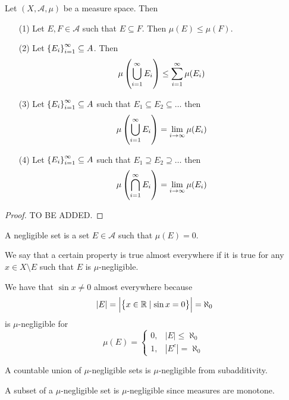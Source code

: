 \documentclass[11pt,a4paper]{article}
\newcommand{\A}{\mathcal A}
\begin{document}
\begin{proposition}
  Let $(X, \A, \mu)$ be a measure space.
  Then
  \begin{enumerate}
    \item[(1)] Let $E,F \in \A$ such that $E \subseteq F$.
      Then $\mu(E) \le \mu(F)$.
    \item[(2)] Let $\set{E_i}_{i=1}^{\infty} \subseteq A$.
      Then
      \[
        \mu\del{\bigcup_{i=1}^{\infty} E_i} \le \sum_{i=1}^{\infty} \mu(E_i)
      \]
    \item[(3)] Let $\set{E_i}_{i=1}^{\infty} \subseteq A$ such that
      $E_1 \subseteq E_2 \subseteq \dots$ then
      \[
        \mu\del{\bigcup_{i=1}^{\infty} E_i} =
        \lim_{i \to \infty} \mu(E_i)
      \]
    \item[(4)] Let $\set{E_i}_{i=1}^{\infty} \subseteq A$ such that
      $E_1 \supseteq E_2 \supseteq \dots$ then
      \[
        \mu\del{\bigcap_{i=1}^{\infty} E_i} =
        \lim_{i \to \infty} \mu(E_i)
      \]
  \end{enumerate}
\end{proposition}
\begin{proof}
  TO BE ADDED.
\end{proof}

\begin{definition}
  A negligible set is a set $E \in \A$ such that $\mu(E) = 0$.
\end{definition}

\begin{definition}
  We say that a certain property is true almost everywhere if it is true
  for any $x \in X \setminus E$ such that $E$ is $\mu$-negligible.
\end{definition}

\begin{example}
  We have that $\sin x \neq 0$ almost everywhere because
  \[
    |E| = \left|\set{x \in \mathbb{R}\mid \sin x = 0}\right| = \aleph_0
  \]
  is $\mu$-negligible for 
  \[
    \mu(E) =
    \begin{cases}
      0, &|E| \le \aleph_0 \\
      1, &|E^c| = \aleph_0
    \end{cases}
  \]
\end{example}
\begin{remark}
  A countable union of $\mu$-negligible sets is $\mu$-negligible from
  subadditivity.
\end{remark}
\begin{remark}
  A subset of a $\mu$-negligible set is $\mu$-negligible since measures are
  monotone.
\end{remark}
\end{document}
